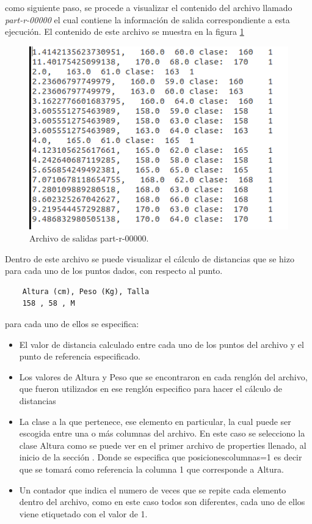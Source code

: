 como siguiente paso, se procede a visualizar el contenido del archivo llamado \emph{part-r-00000} el cual contiene la información de salida correspondiente a esta ejecución. El contenido de este archivo se muestra en la figura \ref{fig:contenido}
\begin{figure}[H]
	\begin{center}
		\hypertarget{fig:contenido}{\hspace{1pt}}
		\includegraphics[width=.7\textwidth]{capitulo4a/images/corrida5.png}
		\caption{Archivo de salidas part-r-00000.}
		\label{fig:contenido}
	\end{center}
\end{figure}
Dentro de este archivo se puede visualizar el cálculo de distancias que se hizo para cada uno de los puntos dados, con respecto al punto.
\begin{lstlisting} 
	Altura (cm), Peso (Kg), Talla
	158 , 58 , M
\end{lstlisting} 
para cada uno de ellos se especifica:
\begin{itemize}
	\item El valor de distancia calculado entre cada uno de los puntos del archivo y el punto de referencia especificado.
	\item Los valores de Altura y Peso que se encontraron en cada renglón del archivo, que fueron utilizados en ese renglón especifico para hacer el cálculo de distancias 
	\item La clase a la que pertenece, ese elemento en particular, la cual puede ser escogida entre una o más columnas del archivo.
	En este caso se selecciono la clase Altura como se puede ver en el primer archivo de properties llenado, al inicio de la sección . Donde se especifica que posicionescolumnas=1 es decir que se tomará como referencia la columna 1 que corresponde a Altura.
	\item Un contador que indica el numero de veces que se repite cada elemento dentro del archivo, como en este caso todos son diferentes, cada uno de ellos viene etiquetado con el valor de 1.
\end{itemize}

